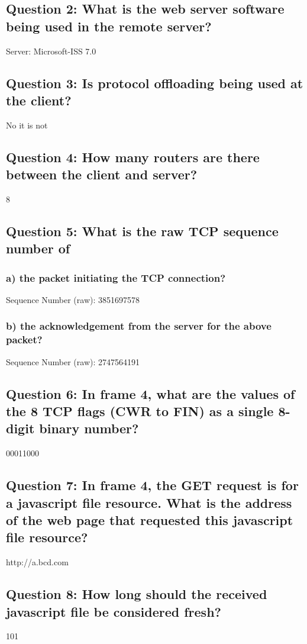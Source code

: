 \documentclass[11pt, oneside, a4paper]{article}
\begin{document}
\subsection*{Question 2: What is the web server software being used in the remote server?}
Server: Microsoft-ISS 7.0

\subsection*{Question 3: Is protocol offloading being used at the client?}
No it is not

\subsection*{Question 4: How many routers are there between the client and server?}
8

\subsection*{Question 5: What is the raw TCP sequence number of}

  \subsubsection*{a) the packet initiating the TCP connection?}
  Sequence Number (raw): 3851697578
  \subsubsection*{b) the acknowledgement from the server for the above packet?}
  Sequence Number (raw): 2747564191

\subsection*{Question 6: In frame 4, what are the values of the 8 TCP flags (CWR to FIN) as a single 8-digit binary number?}
00011000

\subsection*{Question 7: In frame 4, the GET request is for a javascript file resource. What is the address of the web page that requested this javascript file resource?}
http://a.bcd.com

\subsection*{Question 8: How long should the received javascript file be considered fresh?}
101
\end{document}
